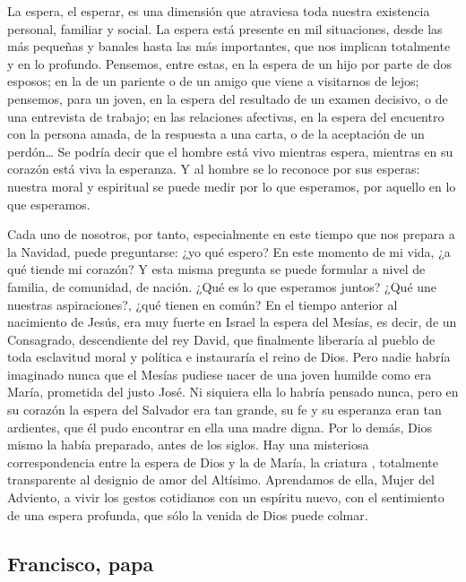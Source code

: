 \begin{body}
{La espera, el esperar, es una dimensión que atraviesa toda nuestra existencia personal, familiar y social. La espera está presente en mil situaciones, desde las más pequeñas y banales hasta las más importantes, que nos implican totalmente y en lo profundo. Pensemos, entre estas, en la espera de un hijo por parte de dos esposos; en la de un pariente o de un amigo que viene a visitarnos de lejos; pensemos, para un joven, en la espera del resultado de un examen decisivo, o de una entrevista de trabajo; en las relaciones afectivas, en la espera del encuentro con la persona amada, de la respuesta a una carta, o de la aceptación de un perdón\ldots{} Se podría decir que el hombre está vivo mientras espera, mientras en su corazón está viva la esperanza. Y al hombre se lo reconoce por sus esperas: nuestra  moral y espiritual se puede medir por lo que esperamos, por aquello en lo que esperamos.

Cada uno de nosotros, por tanto, especialmente en este tiempo que nos prepara a la Navidad, puede preguntarse: ¿yo qué espero? En este momento de mi vida, ¿a qué tiende mi corazón? Y esta misma pregunta se puede formular a nivel de familia, de comunidad, de nación. ¿Qué es lo que esperamos juntos? ¿Qué une nuestras aspiraciones?, ¿qué tienen en común? En el tiempo anterior al nacimiento de Jesús, era muy fuerte en Israel la espera del Mesías, es decir, de un Consagrado, descendiente del rey David, que finalmente liberaría al pueblo de toda esclavitud moral y política e instauraría el reino de Dios. Pero nadie habría imaginado nunca que el Mesías pudiese nacer de una joven humilde como era María, prometida del justo José. Ni siquiera ella lo habría pensado nunca, pero en su corazón la espera del Salvador era tan grande, su fe y su esperanza eran tan ardientes, que él pudo encontrar en ella una madre digna. Por lo demás, Dios mismo la había preparado, antes de los siglos. Hay una misteriosa correspondencia entre la espera de Dios y la de María, la criatura , totalmente transparente al designio de amor del Altísimo. Aprendamos de ella, Mujer del Adviento, a vivir los gestos cotidianos con un espíritu nuevo, con el sentimiento de una espera profunda, que sólo la venida de Dios puede colmar.



\subsection{Francisco, papa}

}
\end{body}
